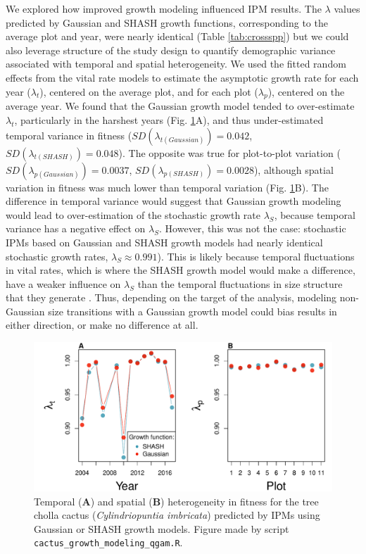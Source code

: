 \documentclass[12pt]{article}
\begin{document}
We explored how improved growth modeling influenced IPM results.
The $\lambda$ values predicted by Gaussian and SHASH growth functions, corresponding to the average plot and year, were nearly identical (Table \ref{tab:crossspp}) but we could also leverage structure of the study design to quantify demographic variance associated with temporal and spatial heterogeneity.
We used the fitted random effects from the vital rate models to estimate the asymptotic growth rate for each year ($\lambda_t$), centered on the average plot, and for each plot ($\lambda_p$), centered on the average year.
We found that the Gaussian growth model tended to over-estimate $\lambda_t$, particularly in the harshest years (Fig. \ref{fig:cactus_lambda}A), and thus under-estimated temporal variance in fitness ($SD(\lambda_{t(Gaussian)})=0.042$, $SD(\lambda_{t(SHASH)})=0.048$). 
The opposite was true for plot-to-plot variation ($SD(\lambda_{p(Gaussian)})=0.0037$, $SD(\lambda_{p(SHASH)})=0.0028$), although spatial variation in fitness was much lower than temporal variation (Fig. \ref{fig:cactus_lambda}B). 
The difference in temporal variance would suggest that Gaussian growth modeling would lead to over-estimation of the stochastic growth rate $\lambda_S$, because temporal variance has a negative effect on $\lambda_S$.
However, this was not the case: stochastic IPMs based on Gaussian and SHASH growth models had nearly identical stochastic growth rates, $\lambda_S \approx 0.991$).  
This is likely because temporal fluctuations in vital rates, which is where the SHASH growth model would make a difference, have a weaker influence on $\lambda_S$ than the temporal fluctuations in size structure that they generate \citep{ellis2013role,compagnoni2016effect}. 
Thus, depending on the target of the analysis, modeling non-Gaussian size transitions with a Gaussian growth model could bias results in either direction, or make no difference at all. 

\begin{figure}[tbp]
	\centering
	\includegraphics[width=1.0\textwidth]{figures/cactus_lambda_years_plots.pdf}
	\caption{Temporal (\textbf{A}) and spatial (\textbf{B}) heterogeneity in fitness for the tree cholla cactus (\textit{Cylindriopuntia imbricata}) predicted by IPMs using Gaussian or SHASH growth models. Figure made by script \texttt{cactus\_growth\_modeling\_qgam.R}.}
	\label{fig:cactus_lambda}
\end{figure} 
\end{document}
